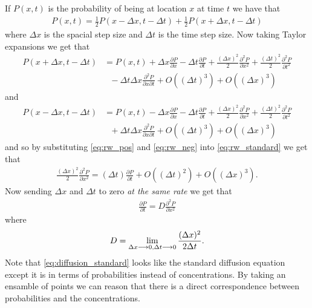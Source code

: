 If $ P(x,t) $ is the probability of being at location $ x $ at time $ t $ we have that
\begin{align}
    \label{eq:rw_standard}
    P(x,t) = \frac{1}{2}P(x-\Delta x, t - \Delta t) + \frac{1}{2}P(x + \Delta x, t - \Delta t)
\end{align}
where $ \Delta x $ is the spacial step size and $ \Delta t $ is the time step size.
Now taking Taylor expansions we get that
\begin{align}
    \label{eq:rw_pos}
    P(x + \Delta x, t - \Delta t) &= P(x,t) + \Delta x \frac{\partial P}{\partial x} - \Delta t \frac{\partial P}{\partial t} + \frac{(\Delta x)^2}{2} \frac{\partial^2 P}{\partial x^2} + \frac{(\Delta t)^2}{2} \frac{\partial^2 P}{\partial t^2} \\ 
    & \ \ \ - \Delta t \Delta x \frac{\partial^2 P}{\partial x \partial t} + O((\Delta t)^3) + O(( \Delta x)^3) \nonumber
\end{align}
and
\begin{align}
    \label{eq:rw_neg}
    P(x - \Delta x, t - \Delta t) &= P(x,t) - \Delta x \frac{\partial P}{\partial x} - \Delta t \frac{\partial P}{\partial t} + \frac{(\Delta x)^2}{2} \frac{\partial^2 P}{\partial x^2} + \frac{(\Delta t)^2}{2} \frac{\partial^2 P}{\partial t^2} \\ 
    & \ \ \ + \Delta t \Delta x \frac{\partial^2 P}{\partial x \partial t} + O((\Delta t)^3) + O(( \Delta x)^3) \nonumber
\end{align}
and so by substituting \eqref{eq:rw_pos} and \eqref{eq:rw_neg} into \eqref{eq:rw_standard} we get that
\begin{align}
    \frac{(\Delta x)^2}{2}\frac{\partial^2 P}{\partial x^2} = (\Delta t) \frac{\partial P}{\partial t} + O((\Delta t)^2) + O((\Delta x)^3).
\end{align}
Now sending $ \Delta x $ and $ \Delta t $ to zero \emph{at the same rate} we get that
\begin{align*}
    \label{eq:diffusion_standard}
    \frac{\partial P}{\partial t} = D \frac{\partial^2 P}{\partial x^2}
\end{align*}
where
\begin{align}
    D = \lim_{\Delta x \longrightarrow 0, \Delta t \longrightarrow 0} \frac{(\Delta x)^2}{2 \Delta t}.
\end{align}
Note that \eqref{eq:diffusion_standard} looks like the standard diffusion equation except it is in terms of probabilities instead of concentrations. By taking an ensamble of points we can reason that there is a direct correspondence between probabilities and the concentrations.
